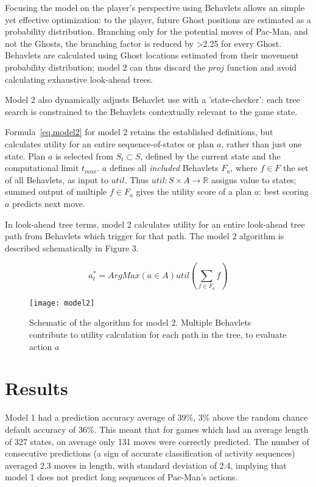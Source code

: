 \documentclass[conference]{IEEEtran}
\begin{document}
Focusing the model on the player's perspective using Behavlets allows an simple yet effective optimization: to the player, future Ghost positions are estimated as a probability distribution. Branching only for the potential moves of Pac-Man, and not the Ghosts, the branching factor is reduced by \textgreater2.25 for every Ghost. Behavlets are calculated using Ghost locations estimated from their movement probability distribution; model 2 can thus discard the $proj$ function and avoid calculating exhaustive look-ahead trees.

Model 2 also dynamically adjusts Behavlet use with a 'state-checker': each tree search is constrained to the Behavlets contextually relevant to the game state.

Formula~\ref{eq.model2} for model 2 retains the established definitions, but calculates utility for an entire sequence-of-states or plan $a$, rather than just one state. Plan $a$ is selected from $S_t \subset S$, defined by the current state and the computational limit $t_{max}$. $a$ defines all \textit{included} Behavlets $F_a$, where $f \in F$ the set of all Behavlets, as input to $util$. Thus $util:S \times A \to \mathbb{R}$ assigns value to states; summed output of multiple $f \in F_a$ gives the utility score of a plan $a$: best scoring $a$ predicts next move.


In look-ahead tree terms, model 2 calculates utility for an entire look-ahead tree path from Behavlets which trigger for that path. The model 2 algorithm is described schematically in Figure 3.

\begin{equation}
	a_t^* = ArgMax(a \in A)  util(\sum_{f \in F_a} f)
	\label{eq.model2}
\end{equation}


\begin{figure*}[!ht]
	\centering
	\texttt{[image: model2]}
	\caption{Schematic of the algorithm for model 2. Multiple Behavlets contribute to utility calculation for each path in the tree, to evaluate action $a$}
	\label{fig.model2}
\end{figure*}

\section{Results}
\label{results}
Model 1 had a prediction accuracy average of 39\%, 3\% above the random chance default accuracy of 36\%. This meant that for games which had an average length of 327 states, on average only 131 moves were correctly predicted. The number of consecutive predictions (a sign of accurate classification of activity sequences) averaged 2.3 moves in length, with standard deviation of 2.4, implying that model 1 does not predict long sequences of Pac-Man's actions.
\end{document}
